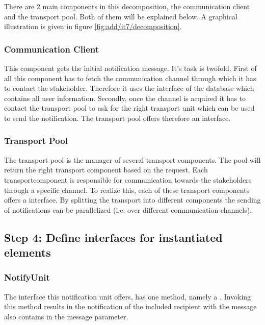 \npar There are 2 main components in this decomposition, the communication
client and the transport pool. Both of them will be explained below. A graphical
illustration is given in figure \ref{fig:add/it7/decomposition}.

\subsubsection{Communication Client} 
\npar This component gets the initial notification message. It's task is
twofold. First of all this component has to fetch the communication channel
through which it has to contact the stakeholder. Therefore it uses the
 interface of the database which contains all user
information. Secondly, once the channel is acquired it has to contact the
transport pool to ask for the right transport unit which can be used to send
the notification. The transport pool offers therefore an 
interface.

\subsubsection{Transport Pool}

\npar The transport pool is the manager of several transport components. The
pool will return the right transport component based on the request. Each
transportcomponent is responsible for communication towards the stakeholders
through a specific channel. To realize this, each of these transport components
offers a  interface. By splitting the transport into different
components the sending of notifications can be parallelized (i.e. over
different communication channels).

\subsection{Step 4: Define interfaces for instantiated elements}
\label{add:it7/interfaces}

\subsubsection{NotifyUnit}
\npar The interface this notification unit offers, has one method, namely a
. Invoking this method results in the notification of the
included recipient with the message also contains in the message parameter.

